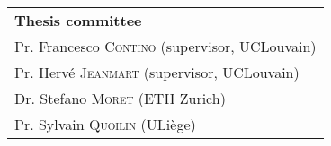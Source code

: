 \begin{titlingpage}
\vspace{\fill}
\begin{small}
\begin{tabular}{l}
\textbf{Thesis committee}\\
\selectfont
Pr. Francesco \textsc{Contino} (supervisor, UCLouvain) \\ 
Pr. Hervé \textsc{Jeanmart} (supervisor, UCLouvain) \\ 
Dr. Stefano \textsc{Moret} (ETH Zurich)\\
Pr. Sylvain \textsc{Quoilin} (ULiège) \\
\end{tabular} 
\end{small}
%
\clearpage

\end{titlingpage}



